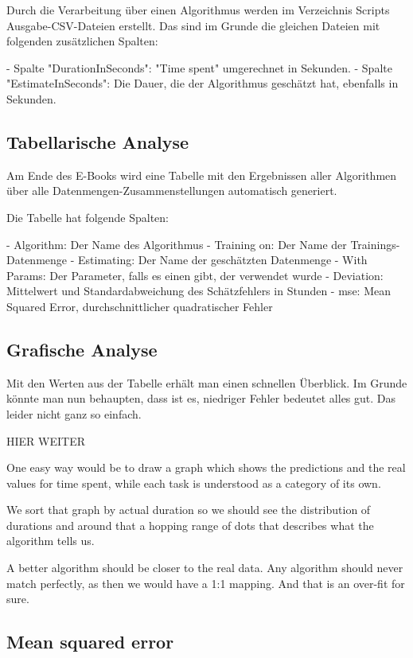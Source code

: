 Durch die Verarbeitung über einen Algorithmus werden im Verzeichnis Scripts\output
Ausgabe-CSV-Dateien erstellt. Das sind im Grunde die gleichen Dateien mit folgenden
zusätzlichen Spalten:

- Spalte "DurationInSeconds": "Time spent" umgerechnet in Sekunden.
- Spalte "EstimateInSeconds": Die Dauer, die der Algorithmus geschätzt hat, ebenfalls in Sekunden.

\subsection{Tabellarische Analyse}

Am Ende des E-Books wird eine Tabelle mit den Ergebnissen aller Algorithmen über alle 
Datenmengen-Zusammenstellungen automatisch generiert.

Die Tabelle hat folgende Spalten:

- Algorithm: Der Name des Algorithmus
- Training on: Der Name der Trainings-Datenmenge
- Estimating: Der Name der geschätzten Datenmenge
- With Params: Der Parameter, falls es einen gibt, der verwendet wurde
- Deviation: Mittelwert und Standardabweichung des Schätzfehlers in Stunden
- mse: Mean Squared Error, durchschnittlicher quadratischer Fehler

\subsection{Grafische Analyse}

Mit den Werten aus der Tabelle erhält man einen schnellen Überblick. 
Im Grunde könnte man nun behaupten, dass ist es, niedriger Fehler bedeutet alles gut. 
Das leider nicht ganz so einfach.

HIER WEITER

One easy way would be to draw a graph which shows the predictions and
the real values for time spent, while each task is understood as a
category of its own.

We sort that graph by actual duration so we should see the distribution
of durations and around that a hopping range of dots that describes what
the algorithm tells us.

A better algorithm should be closer to the real data. Any algorithm
should never match perfectly, as then we would have a 1:1 mapping. And
that is an over-fit for sure.

\hypertarget{mean-squared-error}{%
\subsection{Mean squared error}\label{mean-squared-error}}

